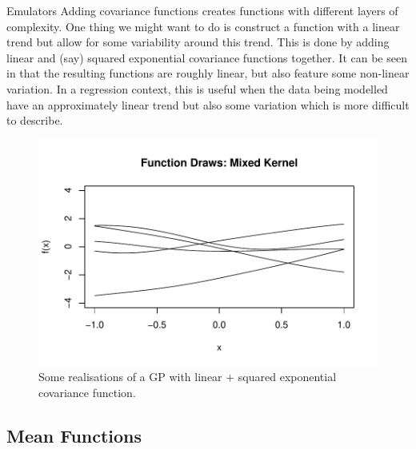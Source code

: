 \begin{chapter}{Emulators \label{Ch:Emulators}}
Adding covariance functions creates functions with different layers of complexity. One thing we might want to do is construct a function with a linear trend but allow for some variability around this trend. This is done by adding linear and (say) squared exponential covariance functions together. It can be seen in  that the resulting functions are roughly linear, but also feature some non-linear variation. In a regression context, this is useful when the data being modelled have an approximately linear trend but also some variation which is more difficult to describe.
\begin{figure}[h]
  \centering
  \includegraphics{fig-emulators/mixed-draws.pdf}
  \caption{Some realisations of a GP with linear $+$ squared exponential covariance function.}
  \label{Fig:mix-kern}
\end{figure}

\subsection{Mean Functions}


\end{chapter}
